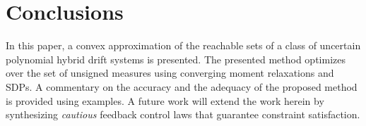 \section{Conclusions}
\label{sec:conclusion}

In this paper, a convex approximation of the reachable sets of a class of uncertain polynomial hybrid drift systems is presented. The presented method optimizes over the set of unsigned measures using converging moment relaxations and SDPs. A commentary on the accuracy and the adequacy of the proposed method is provided using examples. A future work will extend the work herein by synthesizing \emph{cautious} feedback control laws that guarantee constraint satisfaction. 